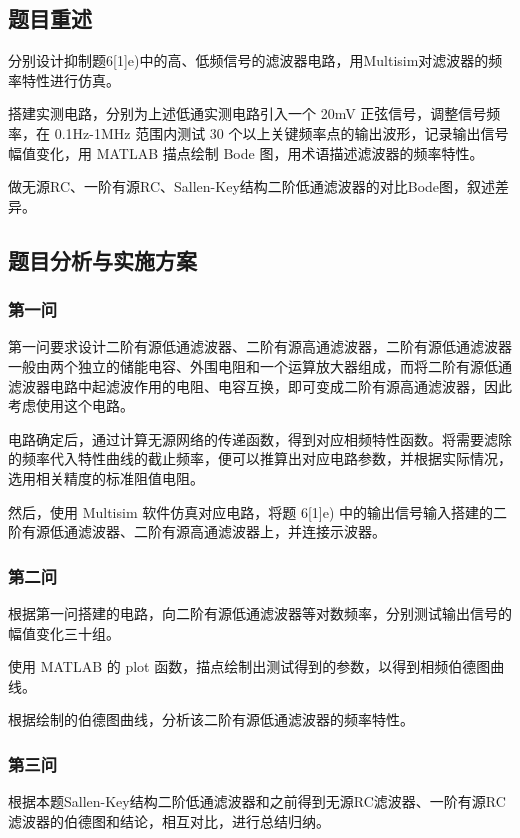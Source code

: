 \documentclass[./测控三级项目.tex]{subfiles} %
\begin{document}
	\subsection{题目重述}
		\begin{compactenum}
			\item 分别设计抑制题6[1]e)中的高、低频信号的滤波器电路，用Multisim对滤波器的频率特性进行仿真。
			\item 搭建实测电路，分别为上述低通实测电路引入一个 20mV 正弦信号，调整信号频率，在 0.1Hz-1MHz 范围内测试 30 个以上关键频率点的输出波形，记录输出信号幅值变化，用 MATLAB 描点绘制 Bode 图，用术语描述滤波器的频率特性。
			\item 做无源RC、一阶有源RC、Sallen-Key结构二阶低通滤波器的对比Bode图，叙述差异。
		\end{compactenum}
	\subsection{题目分析与实施方案}
		\subsubsection{第一问}
			第一问要求设计二阶有源低通滤波器、二阶有源高通滤波器，二阶有源低通滤波器一般由两个独立的储能电容、外围电阻和一个运算放大器组成，而将二阶有源低通滤波器电路中起滤波作用的电阻、电容互换，即可变成二阶有源高通滤波器，因此考虑使用这个电路。\par
			电路确定后，通过计算无源网络的传递函数，得到对应相频特性函数。将需要滤除的频率代入特性曲线的截止频率，便可以推算出对应电路参数，并根据实际情况，选用相关精度的标准阻值电阻。 \par
			然后，使用 Multisim 软件仿真对应电路，将题 6[1]e) 中的输出信号输入搭建的二阶有源低通滤波器、二阶有源高通滤波器上，并连接示波器。
		\subsubsection{第二问}
			根据第一问搭建的电路，向二阶有源低通滤波器等对数频率，分别测试输出信号的幅值变化三十组。\par 
			使用 MATLAB 的 plot 函数，描点绘制出测试得到的参数，以得到相频伯德图曲线。\par 
			根据绘制的伯德图曲线，分析该二阶有源低通滤波器的频率特性。
		\subsubsection{第三问}
			根据本题Sallen-Key结构二阶低通滤波器和之前得到无源RC滤波器、一阶有源RC滤波器的伯德图和结论，相互对比，进行总结归纳。
	
\end{document}
